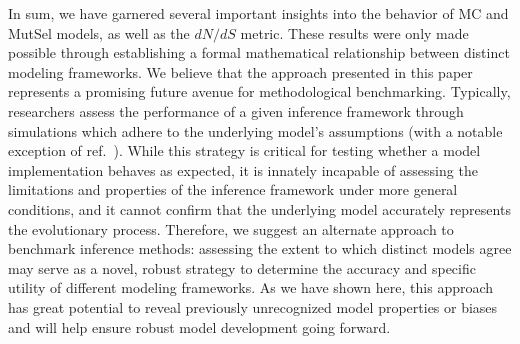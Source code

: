 \documentclass{pnastwo}
\begin{document}
\begin{article}
		




In sum, we have garnered several important insights into the behavior of MC and MutSel models, as well as the $dN/dS$ metric. These results were only made possible through establishing a formal mathematical relationship between distinct modeling frameworks. We believe that the approach presented in this paper represents a promising future avenue for methodological benchmarking. Typically, researchers assess the performance of a given inference framework through simulations which adhere to the underlying model's assumptions (with a notable exception of ref.\ \cite{Holder2008}). While this strategy is critical for testing whether a model implementation behaves as expected, it is innately incapable of assessing the limitations and properties of the inference framework under more general conditions, and it cannot confirm that the underlying model accurately represents the evolutionary process. Therefore, we suggest an alternate approach to benchmark inference methods: assessing the extent to which distinct models agree may serve as a novel, robust strategy to determine the accuracy and specific utility of different modeling frameworks. As we have shown here, this approach has great potential to reveal previously unrecognized model properties or biases and will help ensure robust model development going forward.
		

\end{article}
\end{document}
